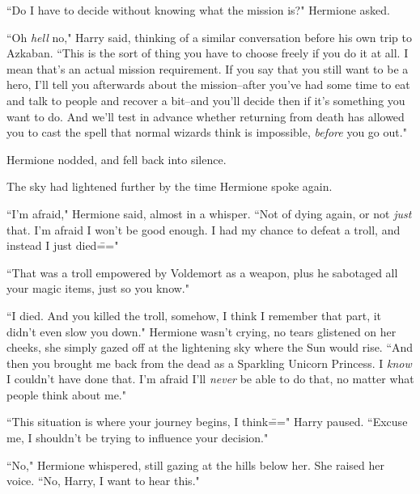 ``Do I have to decide without knowing what the mission is?" Hermione asked.

``Oh \emph{hell} no," Harry said, thinking of a similar conversation before his own trip to Azkaban. ``This is the sort of thing you have to choose freely if you do it at all. I mean that's an actual mission requirement. If you say that you still want to be a hero, I'll tell you afterwards about the mission\---after you've had some time to eat and talk to people and recover a bit\---and you'll decide then if it's something you want to do. And we'll test in advance whether returning from death has allowed you to cast the spell that normal wizards think is impossible, \emph{before} you go out."

Hermione nodded, and fell back into silence.

The sky had lightened further by the time Hermione spoke again.

``I'm afraid," Hermione said, almost in a whisper. ``Not of dying again, or not \emph{just} that. I'm afraid I won't be good enough. I had my chance to defeat a troll, and instead I just died\==="

``That was a troll empowered by Voldemort as a weapon, plus he sabotaged all your magic items, just so you know."

``I died. And you killed the troll, somehow, I think I remember that part, it didn't even slow you down." Hermione wasn't crying, no tears glistened on her cheeks, she simply gazed off at the lightening sky where the Sun would rise. ``And then you brought me back from the dead as a Sparkling Unicorn Princess. I \emph{know} I couldn't have done that. I'm afraid I'll \emph{never} be able to do that, no matter what people think about me."

``This situation is where your journey begins, I think\===" Harry paused. ``Excuse me, I shouldn't be trying to influence your decision."

``No," Hermione whispered, still gazing at the hills below her. She raised her voice. ``No, Harry, I want to hear this."

